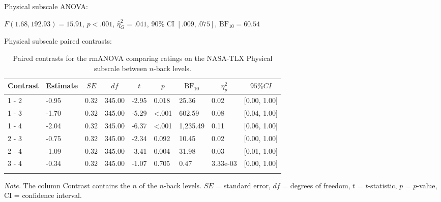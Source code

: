 \documentclass[
  man,floatsintext]{apa6}
\begin{document}
\newpage

Physical subscale ANOVA:

\(F(1.68, 192.93) = 15.91\), \(p < .001\), \(\hat{\eta}^2_G = .041\), 90\% CI \([.009, .075]\), \(\mathrm{BF}_{\textrm{10}} = 60.54\)

Physical subscale paired contrasts:

\begin{table}[H]

\begin{center}
\begin{threeparttable}

\caption{\label{tab:unnamed-chunk-4}Paired contrasts for the rmANOVA comparing ratings on the NASA-TLX Physical subscale between $n$-back levels.}

\begin{tabular}{lllllllll}
\toprule
Contrast & \multicolumn{1}{c}{Estimate} & \multicolumn{1}{c}{$SE$} & \multicolumn{1}{c}{$df$} & \multicolumn{1}{c}{$t$} & \multicolumn{1}{c}{$p$} & \multicolumn{1}{c}{$\mathrm{BF}_{\textrm{10}}$} & \multicolumn{1}{c}{$\eta_{p}^{2}$} & \multicolumn{1}{c}{$95\% CI$}\\
\midrule
1 - 2 & -0.95 & 0.32 & 345.00 & -2.95 & 0.018 & 25.36 & 0.02 & {}[0.00, 1.00]\\
1 - 3 & -1.70 & 0.32 & 345.00 & -5.29 & <.001 & 602.59 & 0.08 & {}[0.04, 1.00]\\
1 - 4 & -2.04 & 0.32 & 345.00 & -6.37 & <.001 & 1,235.49 & 0.11 & {}[0.06, 1.00]\\
2 - 3 & -0.75 & 0.32 & 345.00 & -2.34 & 0.092 & 10.45 & 0.02 & {}[0.00, 1.00]\\
2 - 4 & -1.09 & 0.32 & 345.00 & -3.41 & 0.004 & 31.98 & 0.03 & {}[0.01, 1.00]\\
3 - 4 & -0.34 & 0.32 & 345.00 & -1.07 & 0.705 & 0.47 & 3.33e-03 & {}[0.00, 1.00]\\
\bottomrule
\addlinespace
\end{tabular}

\begin{tablenotes}[para]
\normalsize{\textit{Note.} The column Contrast contains the $n$ of the $n$-back levels. $SE$ = standard error, $df$ = degrees of freedom, $t$ = $t$-statistic, $p$ = $p$-value, CI = confidence interval.}
\end{tablenotes}

\end{threeparttable}
\end{center}

\end{table}
\end{document}
